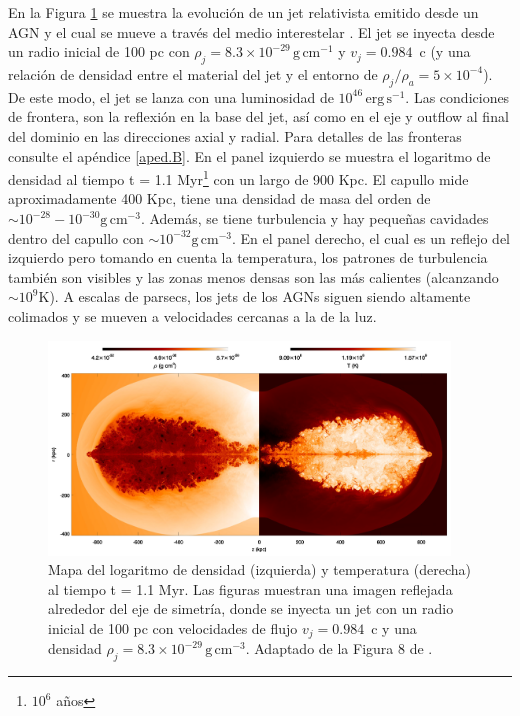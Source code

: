 \documentclass[12pt,a4paper]{book}
\begin{document}
En la Figura \ref{fig:jet_agn} se muestra la evolución de un jet relativista emitido desde un AGN y el cual se mueve a través del medio interestelar \citep{2011ApJ...743...42P}. El jet se inyecta desde un 
radio inicial de 100 pc con $\rho_j = 8.3 \times 10^{-29} \, \text{g}\,\text{cm}^{-1}$ y $v_j = 0.984$~c (y una relación de densidad entre el material del jet y el entorno de $\rho_j / \rho_a = 5\times10^{-4}$). De este modo, 
el jet se lanza con una luminosidad de $10^{46} \, \text{erg} \, \text{s}^{-1}$. Las condiciones de frontera, son la reflexión en la base del jet, así como en el eje y outflow al final del dominio en 
las direcciones axial y radial. Para detalles de las fronteras consulte el apéndice \ref{aped.B}. En el panel izquierdo se muestra el logaritmo de densidad al tiempo t = 1.1 Myr\footnote{$10^6$ años} con un largo de 900 Kpc. 
El capullo mide aproximadamente 400 Kpc, tiene una densidad de masa del 
orden de $\sim10^{-28}-10^{-30} \text{g} \, \text{cm}^{-3}$. Además, se tiene turbulencia y hay pequeñas cavidades dentro del capullo con $\sim10^{-32} \text{g} \, \text{cm}^{-3}$. En el panel derecho, el cual es un reflejo
del izquierdo pero tomando en 
cuenta la temperatura, los patrones de turbulencia también son visibles y las zonas menos densas son las más calientes (alcanzando $\sim 10^9$K). A escalas de parsecs, los jets de los AGNs siguen siendo altamente colimados y 
se mueven a velocidades cercanas a la de la luz.

\begin{figure}
  \begin{center}
    \includegraphics[width=0.95\textwidth]{Figuras/Introduccion/jet_agn.png}
  \end{center}
  \caption{Mapa del logaritmo de densidad (izquierda) y temperatura (derecha) al tiempo t = 1.1 Myr. Las figuras muestran una imagen reflejada alrededor del eje de simetría, donde se inyecta un jet con un radio inicial 
  de 100 pc con velocidades de flujo $v_j = 0.984$~c y una densidad $\rho_j = 8.3 \times 10^{-29} \, \text{g} \,\text{cm}^{-3}$. Adaptado de la Figura 8 de \citet{Marti2019}.}
  \label{fig:jet_agn}
\end{figure}
\end{document}
